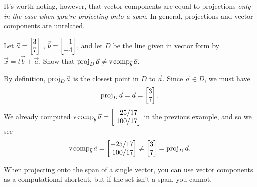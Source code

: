 It's worth noting, however, that vector components are equal to projections \emph{only in the case when you're
projecting onto a span}. In general, projections and vector components are unrelated. 

\begin{example}
	Let $\vec a=\mat{3\\7}$ , $\vec b=\mat{1\\-4}$, and let $D$ be the line given in vector form by
	$\vec x=t\vec b+\vec a$. Show that $\operatorname{proj}_D\vec a\neq \operatorname{v\hspace{1pt}comp}_{\vec b}\vec a$.

	By definition, $\operatorname{proj}_{D}\vec a$ is the closest point in $D$ to $\vec a$. Since $\vec a\in D$, we must
	have 	
	\[
	    \Proj_{D}\vec a = \vec a = \mat{3\\7}.
	\]
	We already computed $\Vcomp_{\vec b}\vec a=\mat{-25/17\\100/17}$ in the previous example, and so we see
	\[
		\Vcomp_{\vec b}\vec a=\mat{-25/17\\100/17}\neq \mat{3\\7}=\Proj_{D}\vec a.
	\]
\end{example}

\begin{emphbox}[Takeaway]
	When projecting onto the span of a single vector, you can use vector components as a computational shortcut, 
	but if the set isn't a span, you cannot.
\end{emphbox}

